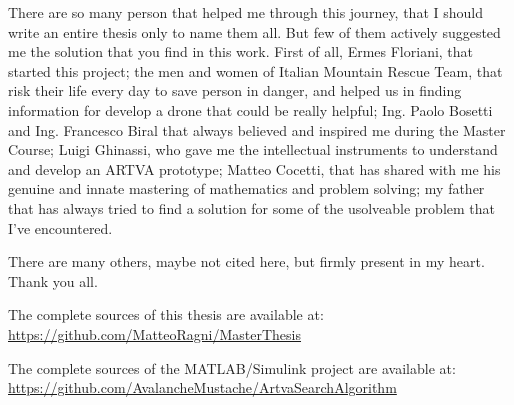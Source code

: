 \begin{aknowledgements}
\noindent
There are so many person that helped me through this journey, that I should write an entire thesis only to name them all. But few of them actively suggested me the solution that you find in this work. First of all, Ermes Floriani, that started this project; the men and women of Italian Mountain Rescue Team, that risk their life every day to save person in danger, and helped us in finding information for develop a drone that could be really helpful; Ing. Paolo Bosetti and Ing. Francesco Biral that always believed and inspired me during the Master Course; Luigi Ghinassi, who gave me the intellectual instruments to understand and develop an ARTVA prototype; Matteo Cocetti, that has shared with me his genuine and innate mastering of mathematics and problem solving; my father that has always tried to find a solution for some of the usolveable problem that I've encountered.

\noindent
There are many others, maybe not cited here, but firmly present in my heart. Thank you all.
\vspace{2cm}

\scriptsize{The complete sources of this thesis are available at: \url{https://github.com/MatteoRagni/MasterThesis}}

\scriptsize{The complete sources of the MATLAB/Simulink project are available at: \url{https://github.com/AvalancheMustache/ArtvaSearchAlgorithm}}
\end{aknowledgements}
